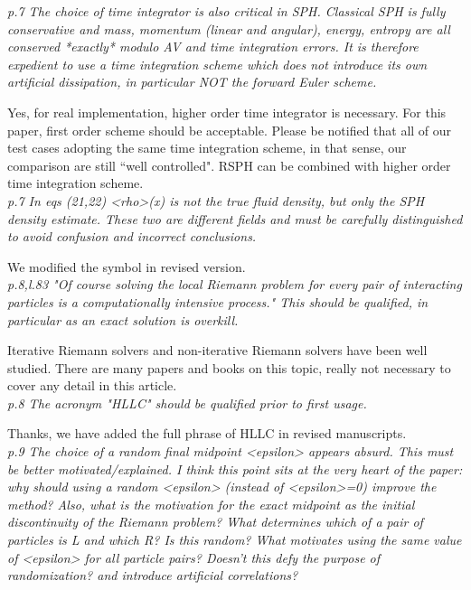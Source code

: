 \documentclass[10pt,a4paper]{article}
\begin{document}
\textit{p.7 The choice of time integrator is also critical in SPH. Classical SPH is fully conservative and mass, momentum (linear and angular), energy, entropy are all conserved *exactly* modulo AV and time integration errors. It is therefore expedient to use a time integration scheme which does not introduce its own artificial dissipation, in particular NOT the forward Euler scheme.}

Yes, for real implementation, higher order time integrator is necessary. For this paper, first order scheme should be acceptable. Please be notified that all of our test cases adopting the same time integration scheme, in that sense, our comparison are still ``well controlled". RSPH can be combined with higher order time integration scheme. 
\\[3pt]

\textit{p.7 In eqs (21,22) <rho>(x) is not the true fluid density, but only the SPH density estimate. These two are different fields and must be carefully distinguished to avoid confusion and incorrect conclusions.}

We modified the symbol in revised version.
\\[3pt]

\textit{p.8,l.83 "Of course solving the local Riemann problem for every pair of interacting particles is a computationally intensive process." This should be qualified, in particular as an exact solution is overkill.}

Iterative Riemann solvers and non-iterative Riemann solvers have been well studied. There are many papers \citep[][e.g.]{roe1981approximate} and books \citep[][e.g.]{toro2013riemann} on this topic, really not necessary to cover any detail in this article.
\\[3pt]

\textit{p.8 The acronym "HLLC" should be qualified prior to first usage.}

Thanks, we have added the full phrase of HLLC in revised manuscripts.
\\[3pt]

\textit{p.9 The choice of a random final midpoint <epsilon> appears absurd. This must be better motivated/explained. I think this point sits at the very heart of the paper: why should using a random <epsilon> (instead of <epsilon>=0) improve the method?
Also, what is the motivation for the exact midpoint as the initial discontinuity of the Riemann problem? What determines which of a pair of particles is L and which R? Is this random? What motivates using the same value of <epsilon> for all particle pairs? Doesn't this defy the purpose of randomization? and introduce artificial correlations?}
\end{document}
